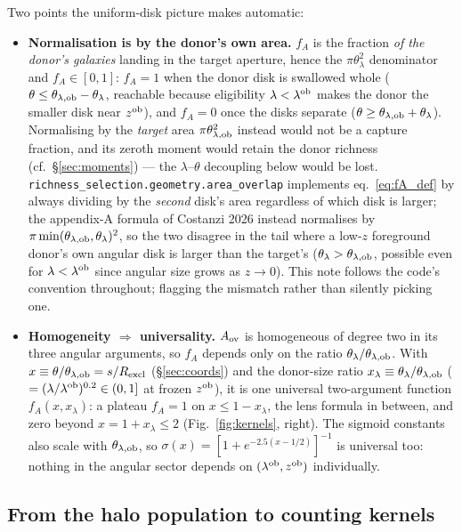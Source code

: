 \documentclass[a4paper, 11pt]{article}
\newcommand{\lob}{\lambda^{\rm ob}}
\newcommand{\zob}{z^{\rm ob}}
\newcommand{\Rex}{R_{\rm excl}}
\newcommand{\rp}{s}
\newcommand{\thob}{\theta_{\lambda,{\rm ob}}}
\begin{document}
Two points the uniform-disk picture makes automatic:
\begin{itemize}
\item \textbf{Normalisation is by the donor's own area.} $f_A$
      is the fraction \emph{of the donor's galaxies} landing in
      the target aperture, hence the $\pi\theta_\lambda^2$
      denominator and $f_A\in[0,1]$: $f_A=1$ when the donor disk
      is swallowed whole ($\theta\le\thob-\theta_\lambda$,
      reachable because eligibility $\lambda<\lob$ makes the
      donor the smaller disk near $\zob$), and $f_A=0$ once the
      disks separate ($\theta\ge\thob+\theta_\lambda$).
      Normalising by the \emph{target} area $\pi\thob^2$ instead
      would not be a capture fraction, and its zeroth moment
      would retain the donor richness
      (cf.\ \S\ref{sec:moments}) --- the $\lambda$--$\theta$
      decoupling below would be lost.
      \texttt{richness\_selection.geometry.area\_overlap}
      implements eq.~\eqref{eq:fA_def} by always dividing by the
      \emph{second} disk's area regardless of which disk is
      larger; the appendix-A formula of Costanzi 2026 instead
      normalises by $\pi\min(\thob,\theta_\lambda)^2$, so the two
      disagree in the tail where a low-$z$ foreground donor's own
      angular disk is larger than the target's
      ($\theta_\lambda>\thob$, possible even for $\lambda<\lob$
      since angular size grows as $z\to0$). This note follows the
      code's convention throughout; flagging the mismatch rather
      than silently picking one.
\item \textbf{Homogeneity $\Rightarrow$ universality.}
      $A_{\rm ov}$ is homogeneous of degree two in its three
      angular arguments, so $f_A$ depends only on the ratio
      $\theta_\lambda/\thob$. With
      $x\equiv\theta/\thob = \rp/\Rex$ (\S\ref{sec:coords}) and
      the donor-size ratio
      $x_\lambda \equiv \theta_\lambda/\thob$
      ($=(\lambda/\lob)^{0.2}\in(0,1]$ at frozen $\zob$), it is
      one universal two-argument function $f_A(x,x_\lambda)$: a
      plateau $f_A=1$ on $x\le 1-x_\lambda$, the lens formula in
      between, and zero beyond $x=1+x_\lambda\le 2$
      (Fig.~\ref{fig:kernels}, right). The sigmoid constants also
      scale with $\thob$, so $\sigma(x)=[1+e^{-2.5(x-1/2)}]^{-1}$
      is universal too: nothing in the angular sector depends on
      $(\lob,\zob)$ individually.
\end{itemize}

\subsection{From the halo population to counting kernels}
\label{sec:Nkernels}
\end{document}
